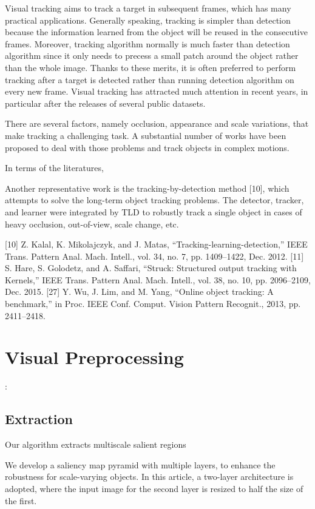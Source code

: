 \documentclass[a4paper]{report}
\begin{document}
Visual tracking aims to track a target in subsequent frames, which has many practical applications. Generally speaking, tracking is simpler than detection because the information learned from the object will be reused in the consecutive frames. Moreover, tracking algorithm normally is much faster than detection algorithm since it only needs to precess a small patch around the object rather than the whole image.
Thanks to these merits, it is often preferred to perform tracking after a target is detected rather than running detection algorithm on every new frame. Visual tracking has attracted much attention in recent years, in particular after the releases of several public datasets. 
 
There are several factors, namely occlusion, appearance and scale variations, that make tracking a challenging task. A substantial number of works have been proposed to deal with those problems and track objects in complex motions.


In terms of the literatures,

Another representative work is the tracking-by-detection method [10], which attempts to solve the long-term object tracking problems.
The detector, tracker, and learner were integrated by TLD to robustly track a single object in cases of heavy occlusion, out-of-view, scale change, etc. 


[10] Z. Kalal, K. Mikolajczyk, and J. Matas, “Tracking-learning-detection,”
IEEE Trans. Pattern Anal. Mach. Intell., vol. 34, no. 7, pp. 1409–1422,
Dec. 2012.
[11] S. Hare, S. Golodetz, and A. Saffari, “Struck: Structured output tracking
with Kernels,” IEEE Trans. Pattern Anal. Mach. Intell., vol. 38, no. 10,
pp. 2096–2109, Dec. 2015.
[27] Y. Wu, J. Lim, and M. Yang, “Online object tracking: A benchmark,” in
Proc. IEEE Conf. Comput. Vision Pattern Recognit., 2013, pp. 2411–2418.


\section{Visual Preprocessing}:
\subsection{Extraction}
Our algorithm extracts multiscale salient regions

We develop a saliency map pyramid with multiple layers, to enhance the robustness for
scale-varying objects. In this article, a two-layer architecture is adopted, where the input image for the second layer is resized to half the size of the first.
\end{document}
